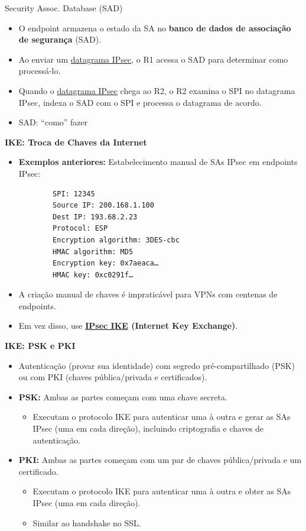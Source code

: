     Security Assoc. Database (SAD)
    \begin{itemize}[left=0.5cm, align=left, nosep]
        \item O endpoint armazena o estado da SA no \textbf{banco de dados de associação de segurança} (SAD).
        \item Ao enviar um \underline{datagrama IPsec}, o R1 acessa o SAD para determinar como processá-lo.
        \item Quando o \underline{datagrama IPsec} chega ao R2, o R2 examina o SPI no datagrama IPsec, indexa o 
        SAD com o SPI e processa o datagrama de acordo.
        \item SAD: ``como'' fazer
    \end{itemize}  

    \textbf{IKE: Troca de Chaves da Internet}
    \begin{itemize}[left=0.5cm, align=left, nosep]
        \item \textbf{Exemplos anteriores:} Estabelecimento manual de SAs IPsec em endpoints IPsec:
        
        \begin{verbatim}
        SPI: 12345
        Source IP: 200.168.1.100
        Dest IP: 193.68.2.23
        Protocol: ESP
        Encryption algorithm: 3DES-cbc
        HMAC algorithm: MD5
        Encryption key: 0x7aeaca…
        HMAC key: 0xc0291f…
        \end{verbatim}

        \item A criação manual de chaves é impraticável para VPNs com centenas de endpoints.
        \item Em vez disso, use \textbf{\underline{IPsec IKE} (Internet Key Exchange)}.
    \end{itemize}     

    \textbf{IKE: PSK e PKI}
    \begin{itemize}[left=0.5cm, align=left, nosep]
        \item Autenticação (provar sua identidade) com segredo pré-compartilhado (PSK) ou com PKI (chaves pública/privada e certificados).
        \item \textbf{PSK:} Ambas as partes começam com uma chave secreta.
        \begin{itemize}[left=0.5cm, nosep, label=$\hookrightarrow$]
            \item Executam o protocolo IKE para autenticar uma à outra e gerar as SAs IPsec (uma em cada direção), 
            incluindo criptografia e chaves de autenticação.
        \end{itemize}
        \item \textbf{PKI:} Ambas as partes começam com um par de chaves pública/privada e um certificado.
        \begin{itemize}[left=0.5cm, nosep, label=$\hookrightarrow$]
            \item Executam o protocolo IKE para autenticar uma à outra e obter as SAs IPsec (uma em cada direção).
            \item Similar ao handshake no SSL.
        \end{itemize}
    \end{itemize} 

